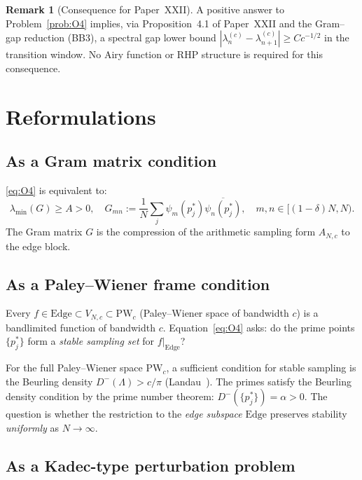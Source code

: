 \documentclass[12pt,a4paper]{amsart}
\theoremstyle{definition}
\newtheorem{remark}[theorem]{Remark}
\newcommand{\Edge}{\mathrm{Edge}}
\newcommand{\PW}{\mathrm{PW}_c}
\begin{document}
\begin{remark}[Consequence for Paper~XXII]
A positive answer to Problem~\ref{prob:O4} implies, via
Proposition~4.1 of Paper~XXII and the Gram--gap reduction (BB3),
a spectral gap lower bound
$|\lambda_n^{(c)} - \lambda_{n+1}^{(c)}| \ge C c^{-1/2}$
in the transition window.
No Airy function or RHP structure is required for this consequence.
\end{remark}

\section{Reformulations}
\label{sec:reformulations}

\subsection{As a Gram matrix condition}

\eqref{eq:O4} is equivalent to:
\[
  \lambda_{\min}(G) \ge A > 0,
  \quad
  G_{mn} := \frac{1}{N}\sum_j \psi_m(p_j^*)\overline{\psi_n(p_j^*)},
  \quad m,n \in [(1-\delta)N, N).
\]
The Gram matrix $G$ is the compression of the
arithmetic sampling form $A_{N,c}$ to the edge block.

\subsection{As a Paley--Wiener frame condition}

Every $f \in \Edge \subset V_{N,c} \subset \PW$
(Paley--Wiener space of bandwidth $c$) is
a bandlimited function of bandwidth $c$.
Equation~\eqref{eq:O4} asks: do the prime points
$\{p_j^*\}$ form a \emph{stable sampling set}
for $f|_{\Edge}$?

For the full Paley--Wiener space $\PW$,
a sufficient condition for stable sampling is
the Beurling density $D^-(\Lambda) > c/\pi$
(Landau~\cite{Landau1967}).
The primes satisfy the Beurling density condition
by the prime number theorem: $D^-(\{p_j^*\}) = \alpha > 0$.
The question is whether the restriction to the
\emph{edge subspace} $\Edge$ preserves stability
\emph{uniformly} as $N \to \infty$.

\subsection{As a Kadec-type perturbation problem}
\end{document}
